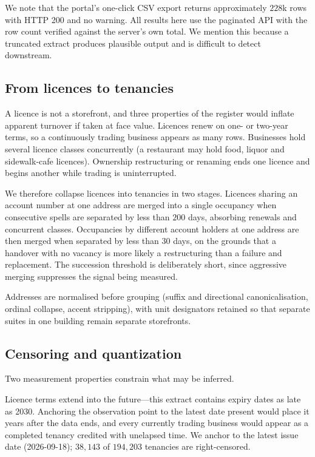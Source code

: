 \documentclass[11pt]{article}
\begin{document}
We note that the portal's one-click CSV export returns approximately $228$k rows
with HTTP 200 and no warning. All results here use the paginated API with the row
count verified against the server's own total. We mention this because a
truncated extract produces plausible output and is difficult to detect
downstream.

\subsection{From licences to tenancies}

A licence is not a storefront, and three properties of the register would inflate
apparent turnover if taken at face value. Licences renew on one- or two-year
terms, so a continuously trading business appears as many rows. Businesses hold
several licence classes concurrently (a restaurant may hold food, liquor and
sidewalk-cafe licences). Ownership restructuring or renaming ends one licence and
begins another while trading is uninterrupted.

We therefore collapse licences into tenancies in two stages. Licences sharing an
account number at one address are merged into a single occupancy when consecutive
spells are separated by less than $200$ days, absorbing renewals and concurrent
classes. Occupancies by different account holders at one address are then merged
when separated by less than $30$ days, on the grounds that a handover with no
vacancy is more likely a restructuring than a failure and replacement. The
succession threshold is deliberately short, since aggressive merging suppresses
the signal being measured.

Addresses are normalised before grouping (suffix and directional
canonicalisation, ordinal collapse, accent stripping), with unit designators
retained so that separate suites in one building remain separate storefronts.

\subsection{Censoring and quantization}

Two measurement properties constrain what may be inferred.

Licence terms extend into the future---this extract contains expiry dates as late
as 2030. Anchoring the observation point to the latest date present would place
it years after the data ends, and every currently trading business would appear
as a completed tenancy credited with unelapsed time. We anchor to the latest
issue date (2026-09-18); $38{,}143$ of $194{,}203$ tenancies are right-censored.
\end{document}
